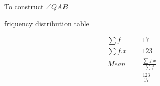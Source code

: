 \begin{table}[!ht]
\centering

\caption{To construct $\angle QAB$}
\caption{friquency distribution table }
\end{table}
\begin{align}
\sum{f} &= 17
\\
\sum{f.x} &= 123 
\\
Mean &= \frac{\sum{f.x}}{\sum{f}}
\\&= \frac{123}{17}
\end{align}
